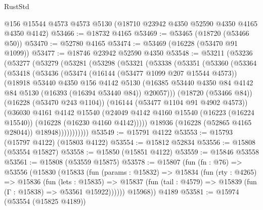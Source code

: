 \begin{lexlean}{RustStd}
\begin{coremodule}
    @156
    @15544
    @4573
    @4573
    @5130
    (@18710 @23942 @4350 @52590 @4350 @4165 @4350 @4142)
@53466 := @18732 @4165
@53469 := @53465 (@18720 (@53466 @50))
@53470 := @52780 @4165
@53474 := @53469 (@16228 (@53470 @91 @1099))
@53477 := @18746 @23942 @52590 @4350
@53548 := @53211
    (@53236
      (@53277
        (@53279
          (@53281
            (@53298
              (@53321
                (@53338
                  (@53351
                    (@53360
                      (@53364
                        (@53418
                          (@53436
                            (@53474
                              (@16144 (@53477 @1099 @207 @15544 @4573))
                              (@18918
                                @53440
                                @4350
                                @156
                                @4142
                                @5130
                                (@16385
                                  @53440
                                  @4350
                                  @84
                                  @4142
                                  @84
                                  @5130
                                  (@16393 (@16394 @53440 @84))
                                  @20057)))
                            (@18720 (@53466 @84))
                            (@16228 (@53470 @243 @1104))
                            (@16144 (@53477 @1104 @91 @4902 @4573))
                            (@36030
                              @4161
                              @4142
                              @15540
                              (@24049
                                @4142
                                @4160
                                @15540
                                (@16223 (@16224 @15540))
                                (@16228 (@16230 @4160 @4142)))))
                          @18936
                          (@16228 (@52865 @4165 @28044))
                          @18948)))))))))))
@53549 := @15791 @4122
@53553 := @15793 (@15797 @4122) (@15803 @4122)
@53554 := @15812 @52834
@53556 := @15808 (@53554 @15827)
@53558 := @15850 (@15851 @4122)
@53559 := @15846 @53558
@53561 := @15808 (@53559 @15875)
@53578 := @15807
    (fun (fn : @76) =>
    @53556
      (@15830
        (@15833
          (fun (params : @15832) =>
          @15834
            (fun (rty : @4265) =>
            @15836
              (fun (lets : @15835) =>
              @15837 (fun (tail : @4579) => @15839 (fun (Γ : @15838) => @53561 @15922))))))
        @15968))
    @4189
@53581 := @15974 (@53554 (@15825 @4189))

\end{coremodule}
\end{lexlean}
